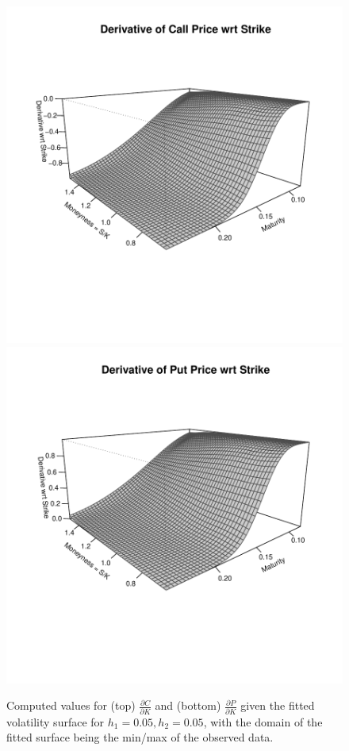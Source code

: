 \documentclass[11pt]{article}
\begin{document}
\begin{figure}[H]
	\centering
 	\includegraphics[scale=0.65]{../plots/q3/call_strike_delta.pdf}
 	\includegraphics[scale=0.65]{../plots/q3/put_strike_delta.pdf}
\caption{Computed values for (top) $\frac{\partial C}{\partial K}$ and (bottom) $\frac{\partial P}{\partial K}$ given the fitted volatility surface for $h_1 = 0.05, h_2 = 0.05$, with the domain of the fitted surface being the min/max of the observed data.}
\label{fig:strike_delta}
\end{figure}
\end{document}
